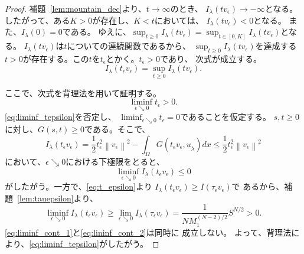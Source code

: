 \begin{proof}
補題~\ref{lem:mountain_dec}より、$t \to \infty$のとき、
$I_\lambda(t v_\epsilon) \to -\infty$となる。
したがって、ある$K>0$が存在し、$K < t$においては、
$I_\lambda(t v_\epsilon) < 0$となる。
また、$I_\lambda(0) = 0$である。
ゆえに、$\sup_{t \geq 0} I_\lambda (tv_\epsilon) = 
\sup_{t \in [0, K]} I_\lambda (tv_\epsilon)$となる。
$I_\lambda(tv_\epsilon)$は$t$についての連続関数であるから、
$\sup_{t \geq 0} I_\lambda (tv_\epsilon)$を達成する
$t > 0$が存在する。この$t$を$t_\epsilon$とかく。$t_\epsilon > 0$であり、
次式が成立する。
\begin{equation}
 I_\lambda(t_\epsilon v_\epsilon) = \sup_{t \geq 0} I_\lambda(t
  v_\epsilon).
  \label{eq:t_epsilon}
\end{equation}

ここで、次式を背理法を用いて証明する。
\begin{equation}
 \liminf_{\epsilon \searrow 0} t_\epsilon > 0. \label{eq:liminf_tepsilon}
\end{equation}
\eqref{eq:liminf_tepsilon}を否定し、
$\liminf_{\epsilon \searrow 0} t_\epsilon = 0$であることを仮定する。
$s, t \geq 0$に対し、$G(s, t) \geq 0$である。そこで、
\begin{equation}
 I_\lambda(t_\epsilon v_\epsilon) = \frac{1}{2} t_\epsilon^2 \left\|
                                                              v_\epsilon
                                                             \right\|^2
 - \int_\Omega G(t_\epsilon v_\epsilon, \underline{u}_\lambda) dx \leq
 \frac{1}{2} t_\epsilon^2 \left\| v_\epsilon \right\|^2
\end{equation}
において、$\epsilon \searrow 0$における下極限をとると、
\begin{equation}
 \liminf_{\epsilon \searrow 0} I_\lambda (t_\epsilon v_\epsilon) \leq
  0 \label{eq:liminf_cont_1}
\end{equation}
がしたがう。一方で、\eqref{eq:t_epsilon}より
$I_\lambda(t_\epsilon v_\epsilon) \geq I(\tau_\epsilon v_\epsilon)$で
あるから、補題~\ref{lem:tauepsilon}より、
\begin{equation}
  \liminf_{\epsilon \searrow 0} I_\lambda(t_\epsilon v_\epsilon) \geq
 \lim_{\epsilon \searrow 0} I_\lambda (\tau_\epsilon v_\epsilon) =
 \frac{1}{NM_1^{(N-2)/2}} S^{N/2} > 0. \label{eq:lininf_cont_2}
\end{equation}
\eqref{eq:liminf_cont_1}と\eqref{eq:lininf_cont_2}は同時に
成立しない。
よって、背理法により、\eqref{eq:liminf_tepsilon}がしたがう。 


\end{proof}
